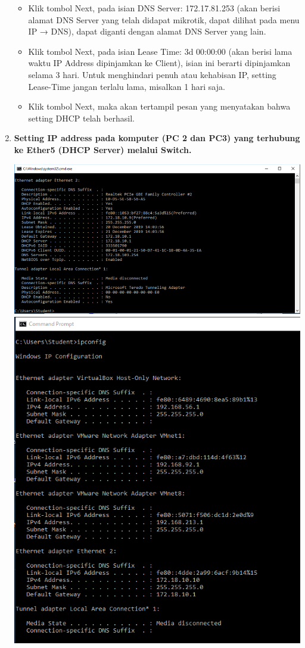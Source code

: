 \documentclass[a4paper,12pt]{article}
\begin{document}
\begin{enumerate}[label=\textbf{\arabic*.}]
\begin{itemize}
            \item Klik tombol Next, pada isian DNS Server: 172.17.81.253 (akan berisi alamat DNS Server yang telah didapat mikrotik, dapat dilihat pada menu IP → DNS), dapat diganti dengan alamat DNS Server yang lain.
            \item Klik tombol Next, pada isian Lease Time: 3d 00:00:00 (akan berisi lama waktu IP Address dipinjamkan ke Client), isian ini berarti dipinjamkan selama 3 hari. Untuk menghindari penuh atau kehabisan IP, setting Lease-Time jangan terlalu lama, misalkan 1 hari saja.
            \item Klik tombol Next, maka akan tertampil pesan yang menyatakan bahwa setting DHCP telah berhasil.
        \end{itemize}

    \item \textbf{Setting IP address pada komputer (PC 2 dan PC3) yang terhubung ke Ether5 (DHCP Server) melalui Switch.}
        \begin{center}
            \includegraphics[scale=0.5]{image6.png}
            \includegraphics[scale=0.5]{image8.png}

\end{center}
\end{enumerate}
\end{document}
